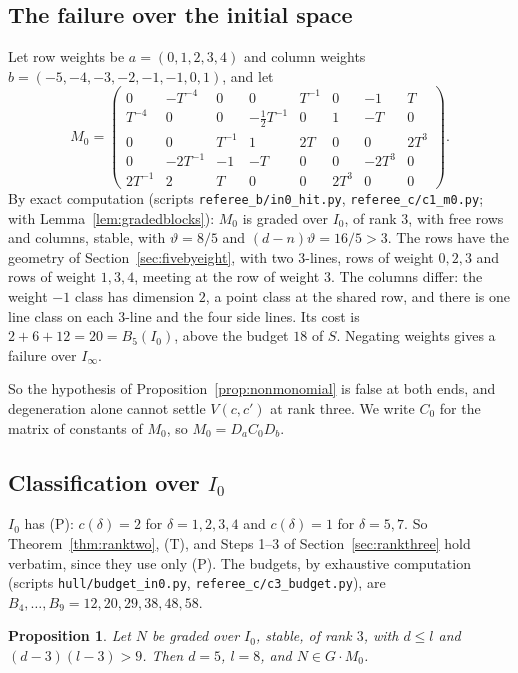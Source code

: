 \documentclass[11pt,a4paper]{article}
\theoremstyle{plain}
\newtheorem{proposition}[lemma]{Proposition}
\theoremstyle{definition}
\newcommand{\vth}{\vartheta}
\newcommand{\Iz}{I_{0}}
\newcommand{\Ii}{I_{\infty}}
\newcommand{\scr}[1]{\nolinkurl{#1}}
\begin{document}
\subsection{The failure over the initial space}

Let row weights be $a=(0,1,2,3,4)$ and column weights $b=(-5,-4,-3,-2,-1,-1,0,1)$, and let
\[
M_{0}=\begin{pmatrix}
0&-T^{-4}&0&0&T^{-1}&0&-1&T\\
T^{-4}&0&0&-\tfrac12T^{-1}&0&1&-T&0\\
0&0&T^{-1}&1&2T&0&0&2T^{3}\\
0&-2T^{-1}&-1&-T&0&0&-2T^{3}&0\\
2T^{-1}&2&T&0&0&2T^{3}&0&0
\end{pmatrix}.
\]
By exact computation (scripts \scr{referee_b/in0_hit.py}, \scr{referee_c/c1_m0.py}; with Lemma~\ref{lem:gradedblocks}): $M_{0}$ is graded over $\Iz$, of rank $3$, with free rows and columns, stable, with $\vth=8/5$ and $(d-n)\vth=16/5>3$. The rows have the geometry of Section~\ref{sec:fivebyeight}, with two $3$-lines, rows of weight $0,2,3$ and rows of weight $1,3,4$, meeting at the row of weight $3$. The columns differ: the weight $-1$ class has dimension $2$, a point class at the shared row, and there is one line class on each $3$-line and the four side lines. Its cost is $2+6+12=20=B_{5}(\Iz)$, above the budget $18$ of $S$. Negating weights gives a failure over $\Ii$.

So the hypothesis of Proposition~\ref{prop:nonmonomial} is false at both ends, and degeneration alone cannot settle $V(c,c')$ at rank three. We write $C_{0}$ for the matrix of constants of $M_{0}$, so $M_{0}=D_{a}C_{0}D_{b}$.

\subsection{Classification over $\Iz$}

$\Iz$ has (P): $c(\delta)=2$ for $\delta=1,2,3,4$ and $c(\delta)=1$ for $\delta=5,7$. So Theorem~\ref{thm:ranktwo}, (T), and Steps 1--3 of Section~\ref{sec:rankthree} hold verbatim, since they use only (P). The budgets, by exhaustive computation (scripts \scr{hull/budget_in0.py}, \scr{referee_c/c3_budget.py}), are $B_{4},\dots,B_{9}=12,20,29,38,48,58$.

\begin{proposition}\label{prop:classification}
Let $N$ be graded over $\Iz$, stable, of rank $3$, with $d\le l$ and $(d-3)(l-3)>9$. Then $d=5$, $l=8$, and $N\in G\cdot M_{0}$.
\end{proposition}
\end{document}
